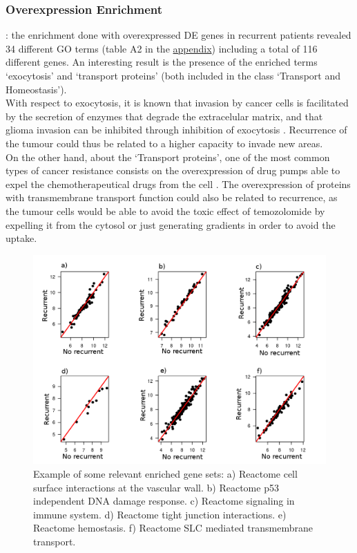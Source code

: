 \documentclass[9pt,twocolumn,twoside]{gsajnl}
\begin{document}
\subsubsection*{Overexpression Enrichment}: the enrichment done with overexpressed DE genes in recurrent patients revealed 34 different GO terms (table A2 in the \href{http://ieoproject.tk/ieo/appendix.pdf}{appendix}) including a total of 116 different genes. An interesting result is the presence of the enriched terms `exocytosis' and `transport proteins' (both included in the class `Transport and Homeostasis').\\
With respect to exocytosis, it is known that invasion by cancer cells is facilitated by the secretion of enzymes that degrade the extracelular matrix, and that glioma invasion can be inhibited through inhibition of exocytosis \citep{Liu2012}. Recurrence of the tumour could thus be related to a higher capacity to invade new areas.\\
On the other hand, about the `Transport proteins', one of the most common types of cancer resistance consists on the overexpression of drug pumps able to expel the chemotherapeutical drugs from the cell \citep{Borst2012}. The overexpression of proteins with transmembrane transport function could also be related to recurrence, as the tumour cells would be able to avoid the toxic effect of temozolomide by expelling it from the cytosol or just generating gradients in order to avoid the uptake.
\begin{figure}[!h]
	\centering
	\includegraphics[scale=0.4]{gsea.png}
	\caption{ Example of some relevant enriched gene sets: a) Reactome cell surface interactions at the vascular wall. b) Reactome p53 independent DNA damage response. c) Reactome signaling in immune system. d) Reactome tight junction interactions. e) Reactome hemostasis. f) Reactome SLC mediated transmembrane transport. }
	\label{fig:gsea}
\end{figure}
\end{document}
